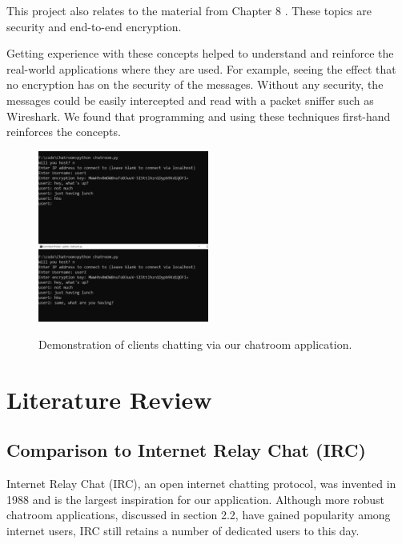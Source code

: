 \documentclass{article}
\begin{document}
This project also relates to the material from Chapter 8 \cite{kurose}. These topics are security and end-to-end encryption. 

Getting experience with these concepts helped to understand and reinforce the real-world applications where they are used. For example, seeing the effect that no encryption has on the security of the messages. Without any security, the messages could be easily intercepted and read with a packet sniffer such as Wireshark. We found that programming and using these techniques first-hand reinforces the concepts.

\begin{figure}[h]
\caption{Demonstration of clients chatting via our chatroom application.}
\centering
\includegraphics[width=0.5\textwidth]{media/usersChatting.PNG}
\label{usersChatting}
\end{figure}

\section{Literature Review}

\subsection{Comparison to Internet Relay Chat (IRC)}


Internet Relay Chat (IRC), an open internet chatting protocol, was invented in 1988 \cite{radwareIRC} and is the largest inspiration for our application. Although more robust chatroom applications, discussed in section 2.2, have gained popularity among internet users, IRC still retains a number of dedicated users to this day.
\end{document}
